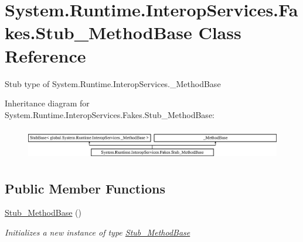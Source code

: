 \hypertarget{class_system_1_1_runtime_1_1_interop_services_1_1_fakes_1_1_stub___method_base}{\section{System.\-Runtime.\-Interop\-Services.\-Fakes.\-Stub\-\_\-\-Method\-Base Class Reference}
\label{class_system_1_1_runtime_1_1_interop_services_1_1_fakes_1_1_stub___method_base}
}


Stub type of System.\-Runtime.\-Interop\-Services.\-\_\-\-Method\-Base 


Inheritance diagram for System.\-Runtime.\-Interop\-Services.\-Fakes.\-Stub\-\_\-\-Method\-Base\-:\begin{figure}[H]
\begin{center}
\leavevmode
\includegraphics[height=1.410579cm]{class_system_1_1_runtime_1_1_interop_services_1_1_fakes_1_1_stub___method_base}
\end{center}
\end{figure}
\subsection*{Public Member Functions}
\begin{DoxyCompactItemize}
\item 
\hyperlink{class_system_1_1_runtime_1_1_interop_services_1_1_fakes_1_1_stub___method_base_a64cd7226b9fd244a6146784d76c1ec58}{Stub\-\_\-\-Method\-Base} ()
\begin{DoxyCompactList}\small\item\em Initializes a new instance of type \hyperlink{class_system_1_1_runtime_1_1_interop_services_1_1_fakes_1_1_stub___method_base}{Stub\-\_\-\-Method\-Base}\end{DoxyCompactList}\end{DoxyCompactItemize}
